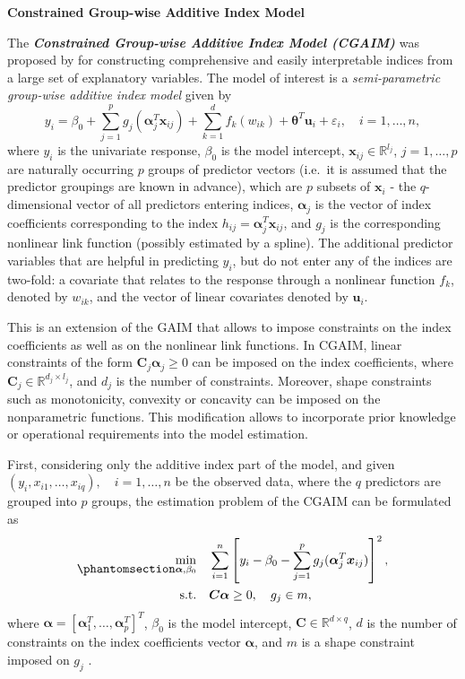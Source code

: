 \documentclass[
  11pt,
  a4paper,
]{article}
\begin{document}
\textbf{Constrained Group-wise Additive Index Model}

The \textbf{\emph{Constrained Group-wise Additive Index Model (CGAIM)}}
was proposed by \textcite{Masselot2022} for constructing comprehensive
and easily interpretable indices from a large set of explanatory
variables. The model of interest is a \emph{semi-parametric group-wise
additive index model} given by \[
  y_{i} = \beta_{0} + \sum_{j = 1}^{p}g_{j}(\bm{\alpha}_{j}^{T}\bm{x}_{ij}) + \sum_{k = 1}^{d}f_{k}(w_{ik}) + \bm{\theta}^{T}\bm{u}_{i} + \varepsilon_{i}, \quad i = 1, \dots, n,
\] where \(y_{i}\) is the univariate response, \(\beta_{0}\) is the
model intercept, \(\bm{x}_{ij} \in \mathbb{R}^{l_{j}}\),
\(j = 1, \dots, p\) are naturally occurring \(p\) groups of predictor
vectors (i.e.~it is assumed that the predictor groupings are known in
advance), which are \(p\) subsets of \(\bm{x}_{i}\) - the
\(q\)-dimensional vector of all predictors entering indices,
\(\bm{\alpha}_{j}\) is the vector of index coefficients corresponding to
the index \(h_{ij} = \bm{\alpha}_{j}^{T}\bm{x}_{ij}\), and \(g_{j}\) is
the corresponding nonlinear link function (possibly estimated by a
spline). The additional predictor variables that are helpful in
predicting \(y_{i}\), but do not enter any of the indices are two-fold:
a covariate that relates to the response through a nonlinear function
\(f_{k}\), denoted by \(w_{ik}\), and the vector of linear covariates
denoted by \(\bm{u}_{i}\).

This is an extension of the GAIM that allows to impose constraints on
the index coefficients as well as on the nonlinear link functions. In
CGAIM, linear constraints of the form
\(\bm{C}_{j}\bm{\alpha}_{j} \ge 0\) can be imposed on the index
coefficients, where \(\bm{C}_{j} \in \mathbb{R}^{d_{j} \times l_{j}}\),
and \(d_{j}\) is the number of constraints. Moreover, shape constraints
such as monotonicity, convexity or concavity can be imposed on the
nonparametric functions. This modification allows to incorporate prior
knowledge or operational requirements into the model estimation.

First, considering only the additive index part of the model, and given
\((y_{i}, x_{i1}, \dots, x_{iq}), \quad i = 1, \dots, n\) be the
observed data, where the \(q\) predictors are grouped into \(p\) groups,
the estimation problem of the CGAIM can be formulated as
\begin{equation}\phantomsection\label{eq-3}{
\begin{aligned}
  \min_{\bm{\alpha}, \beta_{0}} \quad & \sum_{i = 1}^{n}\left [ y_{i} - \beta_{0} - \sum_{j = 1}^{p}g_{j}(\bm{\alpha}_{j}^{T}\bm{x}_{ij})\right ]^{2}, \\
  \text{s.t.} \quad & \bm{C}\bm{\alpha} \ge 0, \quad g_{j} \in m,
\end{aligned}
}\end{equation} where
\(\bm{\alpha} = \left [\bm{\alpha}_{1}^{T}, \dots, \bm{\alpha}_{p}^{T} \right ]^{T}\),
\(\beta_{0}\) is the model intercept,
\(\bm{C} \in \mathbb{R}^{d \times q}\), \(d\) is the number of
constraints on the index coefficients vector \(\bm{\alpha}\), and \(m\)
is a shape constraint imposed on \(g_{j}\) \autocite{Masselot2022}.
\end{document}
